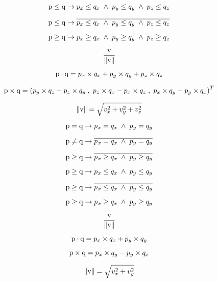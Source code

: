 \documentclass{article}
\begin{document}
\[ \mbox{\boldmath p} \le \mbox{\boldmath q} \rightarrow p_x \le q_x \; \wedge \; p_y \le q_y \; \wedge \; p_z \le q_z \]
\pagebreak

\[ \mbox{\boldmath p} \le \mbox{\boldmath q} \rightarrow \overline{ p_x \le q_x \; \wedge \; p_y \le q_y \; \wedge \; p_z \le q_z } \]
\pagebreak

\[ \mbox{\boldmath p} \ge \mbox{\boldmath q} \rightarrow p_x \ge q_x \; \wedge \; p_y \ge q_y \; \wedge \; p_z \ge q_z \]
\pagebreak

\[ \frac{\mbox{\boldmath v}}{\left\|{\mbox{\boldmath v}}\right\|} \]
\pagebreak

\[ \mbox{\boldmath p} \cdot \mbox{\boldmath q} = p_x \times q_x + p_y \times q_y + p_z \times q_z \]
\pagebreak

\[ \mbox{\boldmath p} \times \mbox{\boldmath q} = \left( p_y \times q_z - p_z \times q_y \;,\; p_z \times q_x - p_x \times q_z \;,\; p_x \times q_y - p_y \times q_x \right)^T \]
\pagebreak

\[ \left\|\mbox{\boldmath v}\right\| = \sqrt{v_x^2 + v_y^2 + v_z^2} \]
\pagebreak

\[ \mbox{\boldmath p} = \mbox{\boldmath q} \rightarrow p_x = q_x \; \wedge \; p_y = q_y \]
\pagebreak

\[ \mbox{\boldmath p} \neq \mbox{\boldmath q} \rightarrow \overline{ p_x = q_x \; \wedge \; p_y = q_y } \]
\pagebreak

\[ \mbox{\boldmath p} \ge \mbox{\boldmath q} \rightarrow \overline{ p_x \ge q_x \; \wedge \; p_y \ge q_y } \]
\pagebreak

\[ \mbox{\boldmath p} \ge \mbox{\boldmath q} \rightarrow p_x \le q_x \; \wedge \; p_y \le q_y \]
\pagebreak

\[ \mbox{\boldmath p} \ge \mbox{\boldmath q} \rightarrow \overline{ p_x \le q_x \; \wedge \; p_y \le q_y } \]
\pagebreak

\[ \mbox{\boldmath p} \ge \mbox{\boldmath q} \rightarrow p_x \ge q_x \; \wedge \; p_y \ge q_y \]
\pagebreak

\[ \frac{\mbox{\boldmath v}}{\left\|\mbox{\boldmath v}\right\|} \]
\pagebreak

\[ \mbox{\boldmath p} \cdot \mbox{\boldmath q} = p_x \times q_x + p_y \times q_y \]
\pagebreak

\[ \mbox{\boldmath p} \times \mbox{\boldmath q} = p_x \times q_y - p_y \times q_x \]
\pagebreak

\[ \left\|\mbox{\boldmath v}\right\| = \sqrt{v_x^2+v_y^2} \]
\pagebreak
\end{document}
